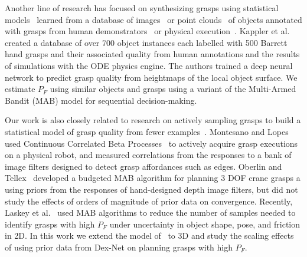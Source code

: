 Another line of research has focused on synthesizing grasps using statistical models~\cite{bohg2014data} learned from a database of images~\cite{lenz2015deep} or point clouds~\cite{detry2013learning, herzog2014learning, zhang2011graspable} of objects annotated with grasps from human demonstrators~\cite{herzog2014learning, lenz2015deep} or physical execution~\cite{herzog2014learning}.
Kappler et al.~\cite{kappler2015leveraging} created a database of over 700 object instances each labelled with 500 Barrett hand grasps and their associated quality from human annotations and the results of simulations with the ODE physics engine.
The authors trained a deep neural network to predict grasp quality from heightmaps of the local object surface.
We estimate $P_F$ using similar objects and grasps using a variant of the Multi-Armed Bandit (MAB) model for sequential decision-making.

Our work is also closely related to research on actively sampling grasps to build a statistical model of grasp quality from fewer examples~\cite{detry2011learning, kroemer2010combining, salganicoff1996active}.
Montesano and Lopes~\cite{montesano2012active} used Continuous Correlated Beta Processes~\cite{goetschalckx2011continuous} to actively acquire grasp executions on a physical robot, and measured correlations from the responses to a bank of image filters designed to detect grasp affordances such as edges.
Oberlin and Tellex~\cite{oberlin2015autonomously} developed a budgeted MAB algorithm for planning 3 DOF crane grasps a using priors from the responses of hand-designed depth image filters, but did not study the effects of orders of magnitude of prior data on convergence.
Recently, Laskey et al.~\cite{laskey2015bandits} used MAB algorithms to reduce the number of samples needed to identify grasps with high $P_F$ under uncertainty in object shape, pose, and friction in 2D.
In this work we extend the model of~\cite{laskey2015bandits} to 3D and study the scaling effects of using prior data from Dex-Net on planning grasps with high $P_F$.

